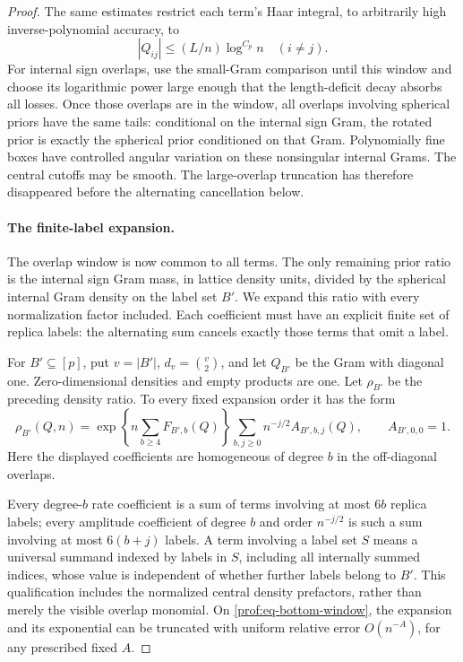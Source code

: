 \begin{proof}
The same estimates restrict each term's Haar integral, to arbitrarily
high inverse-polynomial accuracy, to
\begin{equation}
 |Q_{ij}|\le (L/n)\log^{C_p}n\quad(i\ne j).
 \label{prof:eq-bottom-window}
\end{equation}
For internal sign overlaps, use the small-Gram comparison until this
window and choose its logarithmic power large enough that the
length-deficit decay absorbs all losses.  Once those overlaps are in the
window, all overlaps involving spherical priors have the same tails:
conditional on the internal sign Gram, the rotated prior is exactly the
spherical prior conditioned on that Gram.  Polynomially fine boxes have
controlled angular variation on these nonsingular internal Grams.
The central cutoffs may be smooth.  The large-overlap truncation has
therefore disappeared before the alternating cancellation below.

\paragraph{The finite-label expansion.}
The overlap window is now common to all terms. The only remaining
prior ratio is the internal sign Gram mass, in lattice density units,
divided by the spherical internal Gram density on the label set \(B'\).
We expand this ratio with every normalization factor included. Each
coefficient must have an explicit finite set of replica labels: the
alternating sum cancels exactly those terms that omit a label.

For \(B'\subseteq[p]\), put \(v=|B'|\), \(d_v=\binom v2\), and let
\(Q_{B'}\) be the Gram with diagonal one.  Zero-dimensional densities
and empty products are one.  Let \(\rho_{B'}\) be the preceding density
ratio.  To every fixed expansion order it has the form
\begin{equation}
 \rho_{B'}(Q,n)=
 \exp\left\{n\sum_{b\ge4}F_{B',b}(Q)\right\}
 \sum_{b,j\ge0}n^{-j/2}A_{B',b,j}(Q),
 \qquad A_{B',0,0}=1.
 \label{prof:eq-label-expansion}
\end{equation}
Here the displayed coefficients are homogeneous of degree \(b\) in the
off-diagonal overlaps.

Every degree-\(b\) rate coefficient is a sum of
terms involving at most \(6b\) replica labels; every amplitude coefficient
of degree \(b\) and order \(n^{-j/2}\) is such a sum involving at most
\(6(b+j)\) labels.  A term involving a label set \(S\) means a universal
summand indexed by labels in \(S\), including all internally summed
indices, whose value is independent of whether further labels belong to
\(B'\).  This qualification includes the normalized central density
prefactors, rather than merely the visible overlap monomial.  On
\eqref{prof:eq-bottom-window}, the expansion and its exponential can be
truncated with uniform relative error \(O(n^{-A})\), for any prescribed
fixed \(A\).


\end{proof}
